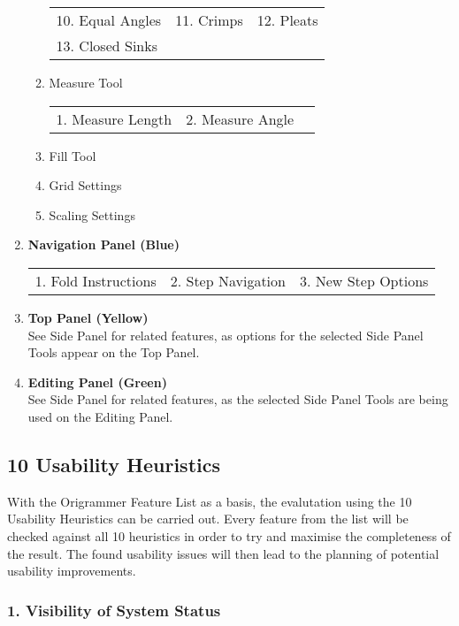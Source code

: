 \begin{enumerate}
\begin{enumerate}
\begin{tabular}{l l l}
        10. Equal Angles & 11. Crimps & 12. Pleats \\
        13. Closed Sinks
        \end{tabular}
        \item Measure Tool \\
        \begin{tabular}{l l l}
        1. Measure Length & 2. Measure Angle \\
        \end{tabular}
        \item Fill Tool
        \item Grid Settings
        \item Scaling Settings
    \end{enumerate}
\item \textbf{Navigation Panel (Blue)} \\
\begin{tabular}{l l l}
1. Fold Instructions & 2. Step Navigation & 3. New Step Options \\
\end{tabular}
\item \textbf{Top Panel (Yellow)} \\
See Side Panel for related features, as options for the selected Side Panel Tools appear on the Top Panel.
\item \textbf{Editing Panel (Green)} \\
See Side Panel for related features, as the selected Side Panel Tools are being used on the Editing Panel.
\end{enumerate}


\subsection{10 Usability Heuristics}
\label{sec:usabilityHeuristics}

With the Origrammer Feature List as a basis, the evalutation using the 10 Usability Heuristics can be carried out. Every feature from the list will be checked against all 10 heuristics in order to try and maximise the completeness of the result. The found usability issues will then lead to the planning of potential usability improvements.




\subsubsection*{1. Visibility of System Status}
\label{sec:visibility}

